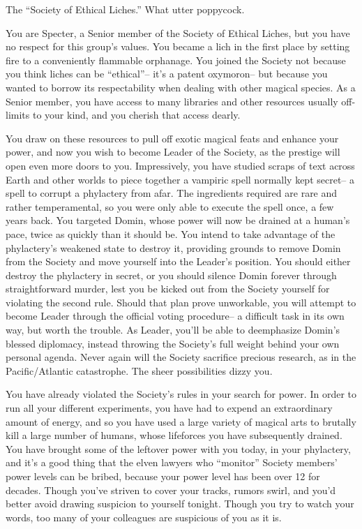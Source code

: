 \documentclass[char]{Sel}
\begin{document}
\name{\cSpecter{}}
The ``Society of Ethical Liches.'' What utter poppycock.

You are Specter, a Senior member of the Society of Ethical Liches, but you have no respect for this group's values. You became a lich in the first place by setting fire to a conveniently flammable orphanage. You joined the Society not because you think liches can be ``ethical''-- it's a patent oxymoron-- but because you wanted to borrow its respectability when dealing with other magical species. As a Senior member, you have access to many libraries and other resources usually off-limits to your kind, and you cherish that access dearly.

You draw on these resources to pull off exotic magical feats and enhance your power, and now you wish to become Leader of the Society, as the prestige will open even more doors to you. Impressively, you have studied scraps of text across Earth and other worlds to piece together a vampiric spell normally kept secret-- a spell to corrupt a phylactery from afar. The ingredients required are rare and rather temperamental, so you were only able to execute the spell once, a few years back. You targeted Domin, whose power will now be drained at a human's pace, twice as quickly than it should be. You intend to take advantage of the phylactery's weakened state to destroy it, providing grounds to remove Domin from the Society and move yourself into the Leader's position. You should either destroy the phylactery in secret, or you should silence Domin forever through straightforward murder, lest you be kicked out from the Society yourself for violating the second rule. Should that plan prove unworkable, you will attempt to become Leader through the official voting procedure-- a difficult task in its own way, but worth the trouble. As Leader, you'll be able to deemphasize Domin's blessed diplomacy, instead throwing the Society's full weight behind your own personal agenda. Never again will the Society sacrifice precious research, as in the Pacific/Atlantic catastrophe. The sheer possibilities dizzy you.

You have already violated the Society's rules in your search for power. In order to run all your different experiments, you have had to expend an extraordinary amount of energy, and so you have used a large variety of magical arts to brutally kill a large number of humans, whose lifeforces you have subsequently drained. You have brought some of the leftover power with you today, in your phylactery, and it's a good thing that the elven lawyers who ``monitor'' Society members' power levels can be bribed, because your power level has been over 12 for decades. Though you've striven to cover your tracks, rumors swirl, and you'd better avoid drawing suspicion to yourself tonight. Though you try to watch your words, too many of your colleagues are suspicious of you as it is.
\end{document}
